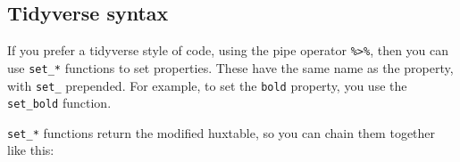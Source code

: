 \documentclass[]{article}
\newenvironment{Shaded}{\begin{snugshade}}{\end{snugshade}}
\newcommand{\KeywordTok}[1]{\textcolor[rgb]{0.13,0.29,0.53}{\textbf{#1}}}
\newcommand{\DataTypeTok}[1]{\textcolor[rgb]{0.13,0.29,0.53}{#1}}
\newcommand{\DecValTok}[1]{\textcolor[rgb]{0.00,0.00,0.81}{#1}}
\newcommand{\StringTok}[1]{\textcolor[rgb]{0.31,0.60,0.02}{#1}}
\newcommand{\OtherTok}[1]{\textcolor[rgb]{0.56,0.35,0.01}{#1}}
\newcommand{\OperatorTok}[1]{\textcolor[rgb]{0.81,0.36,0.00}{\textbf{#1}}}
\newcommand{\NormalTok}[1]{#1}
\begin{document}
\FloatBarrier

\subsection{Tidyverse syntax}\label{tidyverse-syntax}

If you prefer a tidyverse style of code, using the pipe operator
\texttt{\%\textgreater{}\%}, then you can use \texttt{set\_*} functions
to set properties. These have the same name as the property, with
\texttt{set\_} prepended. For example, to set the \texttt{bold}
property, you use the \texttt{set\_bold} function.

\texttt{set\_*} functions return the modified huxtable, so you can chain
them together like this:

\begin{Shaded}
\end{Shaded}
\end{document}
